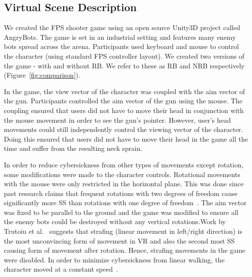 \documentclass{vgtc}                          %
\begin{document}
\subsection{Virtual Scene Description}


We created the FPS shooter game using an open source Unity3D project called AngryBots. The game is set in an industrial setting and features many enemy bots spread across the arena. Participants used keyboard and mouse to control the character (using standard FPS controller layout). We created two versions of the game - with and without RB. We refer to these as RB and NRB respectively (Figure~\ref{fig:comparison}). 


In the game, the view vector of the character was coupled with the aim vector of the gun. Participants controlled the aim vector of the gun using the mouse. The coupling ensured that users did not have to move their head in conjunction with the mouse movement in order to see the gun's pointer. However, user's head movements could still independently control the viewing vector of the character. Doing this ensured that users did not have to move their head in the game all the time and suffer from the resulting neck sprain. 

In order to reduce cybersickness from other types of movements except rotation, some modifications were made to the character controls. Rotational movements with the mouse were only restricted in the horizontal plane. This was done since past research claims that frequent rotations with two degrees of freedom cause significantly more SS than rotations with one degree of freedom~\cite{bonato2009combined}. The aim vector was fixed to be parallel to the ground and the game was modified to ensure all the enemy bots could be destroyed without any vertical rotations.Work by Trutoiu et al.~\cite{Trutoiu2009} suggests that strafing (linear movement in left/right direction) is the most unconvincing form of movement in VR and also the second most SS causing form of movement after rotation. Hence, strafing movements in the game were disabled. In order to minimize cybersickness from linear walking, the character moved at a constant speed~\cite{Bonato2008}. 
\end{document}
